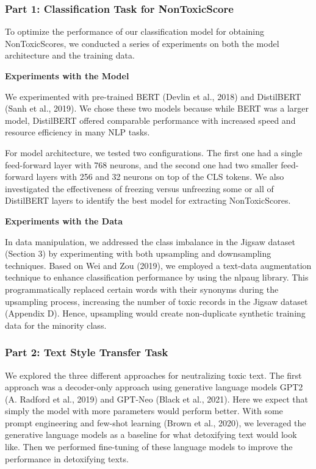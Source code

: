 \documentclass[11pt]{article}
\begin{document}
\subsubsection{Part 1: Classification Task for NonToxicScore}

To optimize the performance of our classification model for obtaining NonToxicScores, we conducted a series of experiments on both the model architecture and the training data.

\textbf{Experiments with the Model}

We experimented with pre-trained BERT (Devlin et al., 2018) and DistilBERT (Sanh et al., 2019). We chose these two models because while BERT was a larger model, DistilBERT offered comparable performance with increased speed and resource efficiency in many NLP tasks.

For model architecture, we tested two configurations. The first one had a single feed-forward layer with 768 neurons, and the second one had two smaller feed-forward layers with 256 and 32 neurons on top of the CLS tokens. We also investigated the effectiveness of freezing versus unfreezing some or all of DistilBERT layers to identify the best model for extracting NonToxicScores.

\textbf{Experiments with the Data}

In data manipulation, we addressed the class imbalance in the Jigsaw dataset (Section 3) by experimenting with both upsampling and downsampling techniques. Based on Wei and Zou (2019), we employed a text-data augmentation technique to enhance classification performance by using the nlpaug library. This programmatically replaced certain words with their synonyms during the upsampling process, increasing the number of toxic records in the Jigsaw dataset (Appendix D). Hence, upsampling would create non-duplicate synthetic training data for the minority class.

\subsubsection{ Part 2: Text Style Transfer Task}

We explored the three different approaches for neutralizing toxic text. The first approach was a decoder-only approach using generative language models GPT2 (A. Radford et al., 2019) and GPT-Neo (Black et al., 2021). Here we expect that simply the model with more parameters would perform better. With some prompt engineering and few-shot learning (Brown et al., 2020), we leveraged the generative language models as a baseline for what detoxifying text would look like. Then we performed fine-tuning of these language models to improve the performance in detoxifying texts. 
\end{document}
